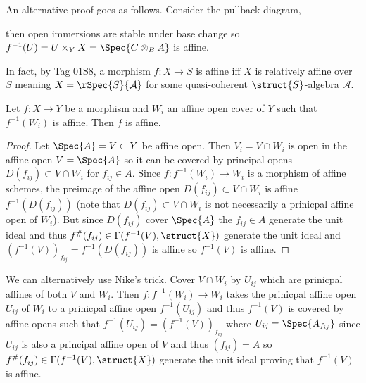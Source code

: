 \documentclass[12pt]{article}
\begin{document}
\begin{rmk}
An alternative proof goes as follows. Consider the pullback diagram,
\begin{center}
\end{center}
then open immersions are stable under base change so $f^{-1}(U) = U \times_Y X = \Spec{C \otimes_B A}$ is affine.
\end{rmk}

\begin{rmk}
In fact, by Tag 01S8, a morphism $f : X \to S$ is affine iff $X$ is relatively affine over $S$ meaning $X = \rSpec{S}{\mathcal{A}}$ for some quasi-coherent $\struct{S}$-algebra $\mathcal{A}$. 
\end{rmk}

\begin{lemma}
Let $f : X \to Y$ be a morphism and $W_i$ an affine open cover of $Y$ such that $f^{-1}(W_i)$ is affine. Then $f$ is affine.
\end{lemma}

\begin{proof}
Let $\Spec{A} = V \subset Y$ be affine open. Then $V_i = V \cap W_i$ is open in the affine open $V = \Spec{A}$ so it can be covered by principal opens $D(f_{ij}) \subset V \cap W_i$ for $f_{ij} \in A$. Since $f : f^{-1}(W_i) \to W_i$ is a morphism of affine schemes, the preimage of the affine open $D(f_{ij}) \subset V \cap W_i$ is affine $f^{-1}(D(f_{ij}))$ (note that $D(f_{ij}) \subset V \cap W_i$ is not necessarily a prinicpal affine open of $W_i$). But since $D(f_{ij})$ cover $\Spec{A}$ the $f_{ij} \in A$ generate the unit ideal and thus $f^\#(f_{ij}) \in \Gamma(f^{-1}(V), \struct{X})$ generate the unit ideal and $(f^{-1}(V))_{f_{ij}} = f^{-1}(D(f_{ij}))$ is affine so $f^{-1}(V)$ is affine.
\end{proof}

\begin{rmk}
We can alternatively use Nike's trick. Cover $V \cap W_i$ by $U_{ij}$ which are prinicpal affines of both $V$ and $W_i$. Then $f : f^{-1}(W_i) \to W_i$ takes the prinicpal affine open $U_{ij}$ of $W_i$ to a prinicpal affine open $f^{-1}(U_{ij})$ and thus $f^{-1}(V)$ is covered by affine opens such that $f^{-1}(U_{ij}) = (f^{-1}(V))_{f_{ij}}$ where $U_{ij} = \Spec{A_{f_{ij}}}$ since $U_{ij}$ is also a principal affine open of $V$ and thus $(f_{ij}) = A$ so $f^\#(f_{ij}) \in \Gamma(f^{-1}(V), \struct{X})$ generate the unit ideal proving that $f^{-1}(V)$ is affine. 
\end{rmk}
\end{document}
